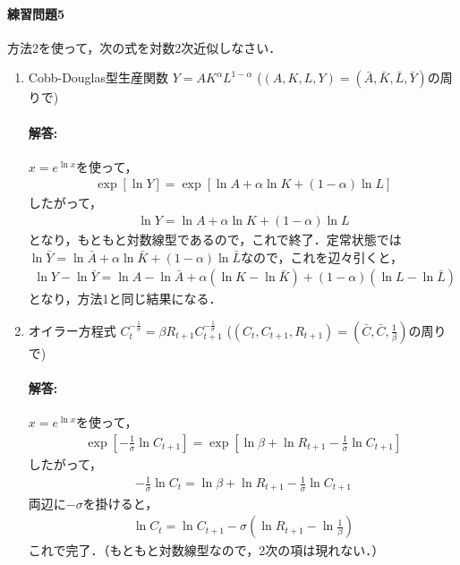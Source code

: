 \documentclass[a4paper,12pt,onecolumn,oneside,notitlepage,final]{article}
\begin{document}
\paragraph{練習問題5} 方法2を使って，次の式を対数2次近似しなさい．
\begin{enumerate}
\item Cobb-Douglas型生産関数 $Y = AK^\alpha L^{1-\alpha}$ \quad ($(A,K,L,Y) = (\bar A, \bar K, \bar L, \bar Y)$の周りで)

\paragraph{解答:} $x = e^{\ln x}$を使って，
\begin{align*}
\exp\left[\ln Y\right] = \exp\left[\ln A + \alpha \ln K + (1-\alpha) \ln L\right]
\end{align*}
したがって，
\begin{align*}
\ln Y = \ln A + \alpha \ln K + (1-\alpha) \ln L
\end{align*}
となり，もともと対数線型であるので，これで終了．定常状態では$\ln \bar Y = \ln \bar A + \alpha \ln \bar K + (1-\alpha) \ln \bar L$なので，これを辺々引くと，
\begin{align*}
\ln Y - \ln \bar Y = \ln A - \ln \bar A + \alpha (\ln K - \ln \bar K) + (1-\alpha) (\ln L - \ln \bar L)
\end{align*}
となり，方法1と同じ結果になる．\\

\item オイラー方程式 $C_t^{-\frac{1}{\sigma}} = \beta R_{t+1} C_{t+1}^{-\frac{1}{\sigma}}$ \quad ($(C_t, C_{t+1}, R_{t+1}) = (\bar C, \bar C, \frac{1}{\beta})$の周りで)

\paragraph{解答:} $x = e^{\ln x}$を使って，
\begin{align*}
\exp\left[ -\frac{1}{\sigma} \ln C_{t+1}\right] = \exp\left[\ln \beta + \ln R_{t+1} -\frac{1}{\sigma} \ln C_{t+1}\right]
\end{align*}
したがって，
\begin{align*}
-\frac{1}{\sigma} \ln C_{t} = \ln \beta + \ln R_{t+1} -\frac{1}{\sigma} \ln C_{t+1}
\end{align*}
両辺に$-\sigma$を掛けると，
\begin{align*}
\ln C_{t} =  \ln C_{t+1} -\sigma \left(\ln R_{t+1} - \ln \frac{1}{\beta}\right) 
\end{align*}
これで完了．（もともと対数線型なので，2次の項は現れない．）\\


\end{enumerate}
\end{document}
